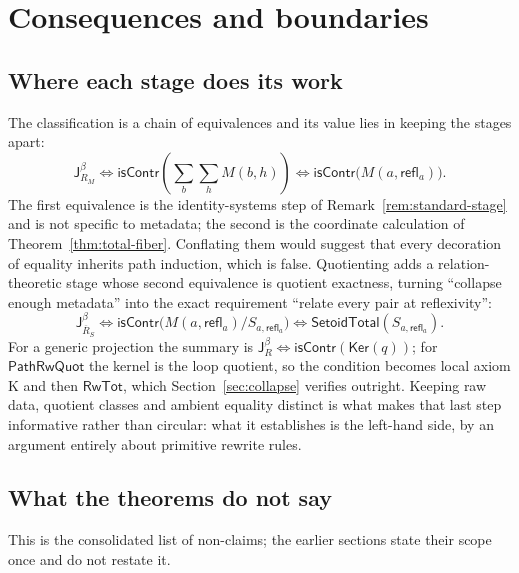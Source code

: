 \documentclass[10pt,reqno]{amsart}
\newcommand{\isContr}{\mathsf{isContr}}
\newcommand{\Jbeta}{\mathsf J^\beta}
\newcommand{\RwTot}{\mathsf{RwTot}}
\newcommand{\refl}{\mathsf{refl}}
\newcommand{\SetTot}{\mathsf{SetoidTotal}}
\newcommand{\Ker}{\mathsf{Ker}}
\newcommand{\PRW}{\mathsf{PathRwQuot}}
\begin{document}
\section{Consequences and boundaries}
\label{sec:comparison}

\subsection{Where each stage does its work}

The classification is a chain of equivalences and its value lies in keeping the
stages apart:
\[
 \Jbeta_{R_M}
 \Longleftrightarrow
   \isContr\!\left(\sum_b\sum_hM(b,h)\right)
 \Longleftrightarrow
   \isContr\bigl(M(a,\refl_a)\bigr).
\tag{14.1}\label{eq:new-chain}
\]
The first equivalence is the identity-systems step of
Remark~\ref{rem:standard-stage} and is not specific to metadata; the second is
the coordinate calculation of Theorem~\ref{thm:total-fiber}.  Conflating them
would suggest that every decoration of equality inherits path induction, which is
false.  Quotienting adds a relation-theoretic stage whose second equivalence is
quotient exactness, turning ``collapse enough metadata'' into the exact
requirement ``relate every pair at reflexivity'':
\[
 \Jbeta_{\overline R_S}
 \Longleftrightarrow
 \isContr\bigl(M(a,\refl_a)/S_{a,\refl_a}\bigr)
 \Longleftrightarrow
 \SetTot(S_{a,\refl_a}).
\tag{14.2}\label{eq:repair-chain}
\]
For a generic projection the summary is
\(\Jbeta_R\Longleftrightarrow\isContr(\Ker(q))\); for \(\PRW\) the kernel is the
loop quotient, so the condition becomes local axiom K and then \(\RwTot\), which
Section~\ref{sec:collapse} verifies outright.  Keeping raw data, quotient
classes and ambient equality distinct is what makes that last step informative
rather than circular: what it establishes is the left-hand side, by an argument
entirely about primitive rewrite rules.

\subsection{What the theorems do not say}
\label{subsec:not-said}

This is the consolidated list of non-claims; the earlier sections state their
scope once and do not restate it.
\end{document}
